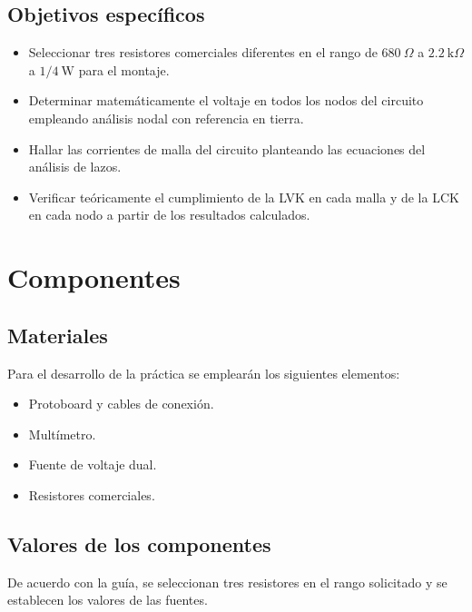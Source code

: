\documentclass[conference,10pt]{IEEEtran}
\begin{document}
\subsection{Objetivos específicos}
\begin{itemize}
  \item Seleccionar tres resistores comerciales diferentes en el rango de $680~\Omega$ a $2.2~\mathrm{k}\Omega$ a $1/4~\mathrm{W}$ para el montaje.
  \item Determinar matemáticamente el voltaje en todos los nodos del circuito empleando análisis nodal con referencia en tierra.
  \item Hallar las corrientes de malla del circuito planteando las ecuaciones del análisis de lazos.
  \item Verificar teóricamente el cumplimiento de la LVK en cada malla y de la LCK en cada nodo a partir de los resultados calculados.
\end{itemize}

\section{Componentes}
\subsection{Materiales}
Para el desarrollo de la práctica se emplearán los siguientes elementos:
\begin{itemize}
  \item Protoboard y cables de conexión.
  \item Multímetro.
  \item Fuente de voltaje dual.
  \item Resistores comerciales.
\end{itemize}

\subsection{Valores de los componentes}
De acuerdo con la guía, se seleccionan tres resistores en el rango solicitado y se establecen los valores de las fuentes.

\begin{table}[H]
  \caption{Valores nominales de los componentes para el laboratorio}
  \label{tab:componentes}
  \centering
\end{table}
\end{document}

